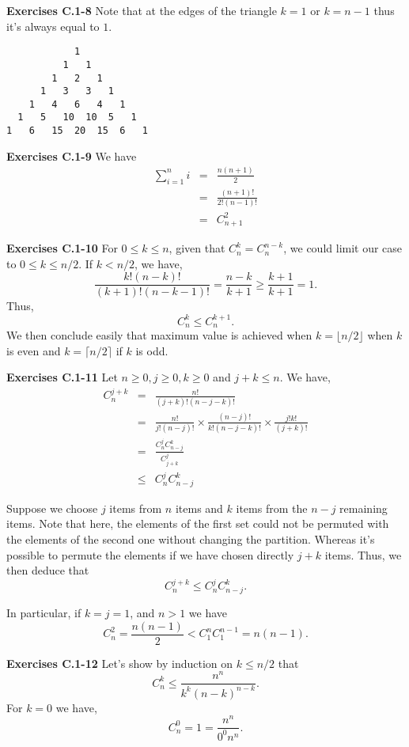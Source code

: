 \documentclass[a4paper,12pt]{article}
\newcommand{\newpar}[1]
{\bigskip \noindent \textbf{Exercises #1} \newline}
\begin{document}
\newpar{C.1-8}
Note that at the edges of the triangle $k = 1$ or $k = n-1$ thus it's
always equal to $1$.
\begin{verbatim}
            1
          1   1
        1   2   1
      1   3   3   1
    1   4   6   4   1
  1   5   10  10  5   1
1   6   15  20  15  6   1  
\end{verbatim}

\newpar{C.1-9}
We have
\begin{eqnarray*}
  \sum_{i=1}^n i &=& \frac{n(n+1)}{2} \\
  &=& \frac{(n+1)!}{2!(n-1)!} \\
  &=& C_{n+1}^2
\end{eqnarray*}

\newpar{C.1-10}
For $0 \le k \le n$, given that $C_n^k = C_n^{n-k}$, we could limit
our case to $0 \le k \le n/2$.  If $ k < n/2$, we have,
\[ \frac{k!(n-k)!}{(k+1)!(n-k-1)!} = \frac{n-k}{k+1} \ge
\frac{k+1}{k+1} = 1.\]
Thus,
\[ C_n^k \le C_n^{k+1}.\]
We then conclude easily that maximum value is achieved when $k =
\lfloor n/2\rfloor$ when $k$ is even and $k = \lceil n/2\rceil$ if $k$
is odd.

\newpar{C.1-11}
Let $n \ge 0, j \ge 0, k \ge 0$ and $j+k \le n$.  We have,
\begin{eqnarray*}
  C_n^{j+k} &=& \frac{n!}{(j+k)!(n-j-k)!} \\
  &=& \frac{n!}{j!(n-j)!} \times
  \frac{(n-j)!}{k!(n-j-k)!} \times
  \frac{j!k!}{(j+k)!} \\
  &=& \frac{C_n^j C_{n-j}^k}{C_{j+k}^j} \\
  &\le& C_n^j C_{n-j}^k
\end{eqnarray*}

Suppose we choose $j$ items from $n$ items and $k$ items from the $n-j$
remaining items.  Note that here, the elements of the first set could
not be permuted with the elements of the second one without changing
the partition.  Whereas it's possible to permute the elements if we
have chosen directly $j+k$ items.  Thus, we then deduce that
\[ C_n^{j+k} \le C_n^j C_{n-j}^k.\]

In particular, if $k=j=1$, and $n > 1$ we have
\[C_n^2 = \frac{n(n-1)}{2} < C_1^n C_1^{n-1} = n(n-1).\]

\newpar{C.1-12}
Let's show by induction on $k \le n/2$ that
\[ C_n^k \le \frac{n^n}{k^k(n-k)^{n-k}}.\]
For $k = 0$ we have,
\[ C_n^0 = 1 = \frac{n^n}{0^0n^n}.\]
\end{document}
